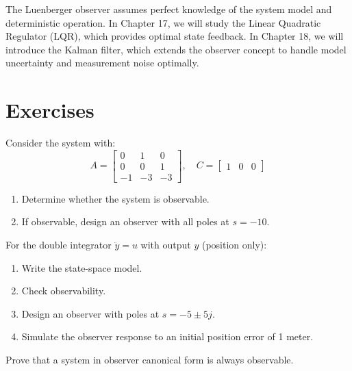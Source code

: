 The Luenberger observer assumes perfect knowledge of the system model and deterministic operation. In Chapter 17, we will study the Linear Quadratic Regulator (LQR), which provides optimal state feedback. In Chapter 18, we will introduce the Kalman filter, which extends the observer concept to handle model uncertainty and measurement noise optimally.

\newpage
\section{Exercises}

\begin{exercise}
Consider the system with:
\begin{equation}
A = \begin{bmatrix} 0 & 1 & 0 \\ 0 & 0 & 1 \\ -1 & -3 & -3 \end{bmatrix}, \quad
C = \begin{bmatrix} 1 & 0 & 0 \end{bmatrix}
\end{equation}
\begin{enumerate}
    \item[(a)] Determine whether the system is observable.
    \item[(b)] If observable, design an observer with all poles at $s = -10$.
\end{enumerate}
\end{exercise}

\begin{exercise}
For the double integrator $\ddot{y} = u$ with output $y$ (position only):
\begin{enumerate}
    \item[(a)] Write the state-space model.
    \item[(b)] Check observability.
    \item[(c)] Design an observer with poles at $s = -5 \pm 5j$.
    \item[(d)] Simulate the observer response to an initial position error of 1 meter.
\end{enumerate}
\end{exercise}

\begin{exercise}
Prove that a system in observer canonical form is always observable.
\end{exercise}

